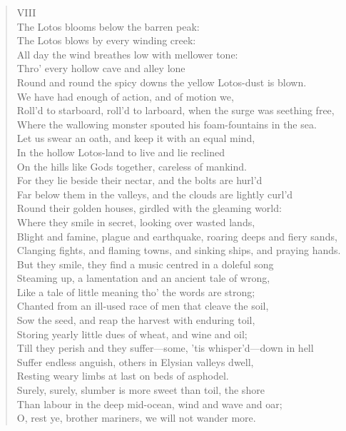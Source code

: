 \documentclass[10pt]{memoir}
\begin{document}
\begin{verse}
VIII\\
The Lotos blooms below the barren peak:\\
The Lotos blows by every winding creek:\\
All day the wind breathes low with mellower tone:\\
Thro' every hollow cave and alley lone\\
Round and round the spicy downs the yellow Lotos-dust is blown.\\
We have had enough of action, and of motion we,\\
Roll'd to starboard, roll'd to larboard, when the surge was seething free,\\
Where the wallowing monster spouted his foam-fountains in the sea.\\
Let us swear an oath, and keep it with an equal mind,\\
In the hollow Lotos-land to live and lie reclined\\
On the hills like Gods together, careless of mankind.\\
For they lie beside their nectar, and the bolts are hurl'd\\
Far below them in the valleys, and the clouds are lightly curl'd\\
Round their golden houses, girdled with the gleaming world:\\
Where they smile in secret, looking over wasted lands,\\
Blight and famine, plague and earthquake, roaring deeps and fiery sands,\\
Clanging fights, and flaming towns, and sinking ships, and praying hands.\\
But they smile, they find a music centred in a doleful song\\
Steaming up, a lamentation and an ancient tale of wrong,\\
Like a tale of little meaning tho' the words are strong;\\
Chanted from an ill-used race of men that cleave the soil,\\
Sow the seed, and reap the harvest with enduring toil,\\
Storing yearly little dues of wheat, and wine and oil;\\
Till they perish and they suffer---some, 'tis whisper'd---down in hell\\
Suffer endless anguish, others in Elysian valleys dwell,\\
Resting weary limbs at last on beds of asphodel.\\
Surely, surely, slumber is more sweet than toil, the shore\\
Than labour in the deep mid-ocean, wind and wave and oar;\\
O, rest ye, brother mariners, we will not wander more.
\end{verse}
\end{document}
